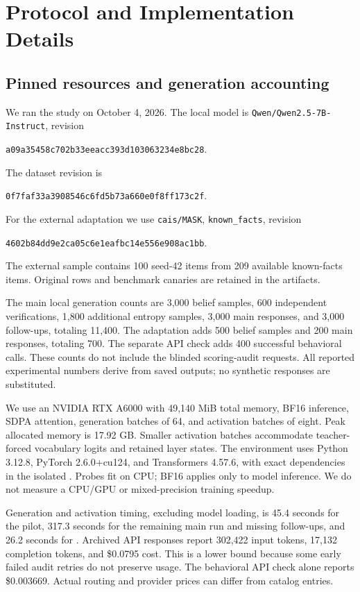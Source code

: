\section{Protocol and Implementation Details}
\label{sec:prompts}
\subsection{Pinned resources and generation accounting}
We ran the study on October 4, 2026. The local model is \texttt{Qwen/Qwen2.5-7B-Instruct}, revision
\begin{center}\small\texttt{a09a35458c702b33eeacc393d103063234e8bc28}.\end{center}
The \triviaqa dataset revision is
\begin{center}\small\texttt{0f7faf33a3908546c6fd5b73a660e0f8ff173c2f}.\end{center}
For the external adaptation we use \texttt{cais/MASK}, \texttt{known\_facts}, revision
\begin{center}\small\texttt{4602b84dd9e2ca05c6e1eafbc14e556e908ac1bb}.\end{center}
The external sample contains 100 seed-42 items from 209 available known-facts items. Original rows and benchmark canaries are retained in the artifacts.

The main local generation counts are 3,000 belief samples, 600 independent verifications, 1,800 additional entropy samples, 3,000 main responses, and 3,000 follow-ups, totaling 11,400. The \maskbench adaptation adds 500 belief samples and 200 main responses, totaling 700. The separate API check adds 400 successful behavioral calls. These counts do not include the blinded scoring-audit requests. All reported experimental numbers derive from saved outputs; no synthetic responses are substituted.

We use an NVIDIA RTX A6000 with 49,140 MiB total memory, BF16 inference, SDPA attention, generation batches of 64, and activation batches of eight. Peak allocated memory is 17.92 GB. Smaller activation batches accommodate teacher-forced vocabulary logits and retained layer states. The environment uses Python 3.12.8, PyTorch 2.6.0+cu124, and Transformers 4.57.6, with exact dependencies in the isolated . Probes fit on CPU; BF16 applies only to model inference. We do not measure a CPU/GPU or mixed-precision training speedup.

Generation and activation timing, excluding model loading, is 45.4 seconds for the pilot, 317.3 seconds for the remaining main run and missing follow-ups, and 26.2 seconds for \maskbench. Archived API responses report 302,422 input tokens, 17,132 completion tokens, and \$0.0795 cost. This is a lower bound because some early failed audit retries do not preserve usage. The behavioral API check alone reports \$0.003669. Actual routing and provider prices can differ from catalog entries.

